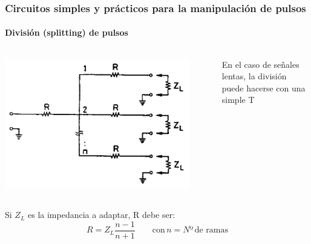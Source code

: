 \documentclass{beamer}
\begin{document}
\begin{frame}
\frametitle{Circuitos simples y prácticos para la manipulación de
pulsos}
\framesubtitle{{\color{blue}División (splitting) de pulsos}}
\begin{columns}
\begin{column}{0.5\textwidth}
\begin{center}
\includegraphics[width=0.9\textwidth]{d2/pulse_splitting}
\end{center}
\end{column}
\begin{column}{0.45\textwidth}
\begin{alertblock}{}
En el caso de señales lentas, la división puede hacerse con una simple T
\end{alertblock}
\end{column}
\end{columns}
\begin{alertblock}{}
Si $Z_L$ es la impedancia a adaptar, R debe ser:
$$R = Z_L\frac{n - 1}{n + 1} \qquad \text{con}\, n = Nº\,\text{de ramas}$$
\end{alertblock}
\end{frame}
\end{document}
